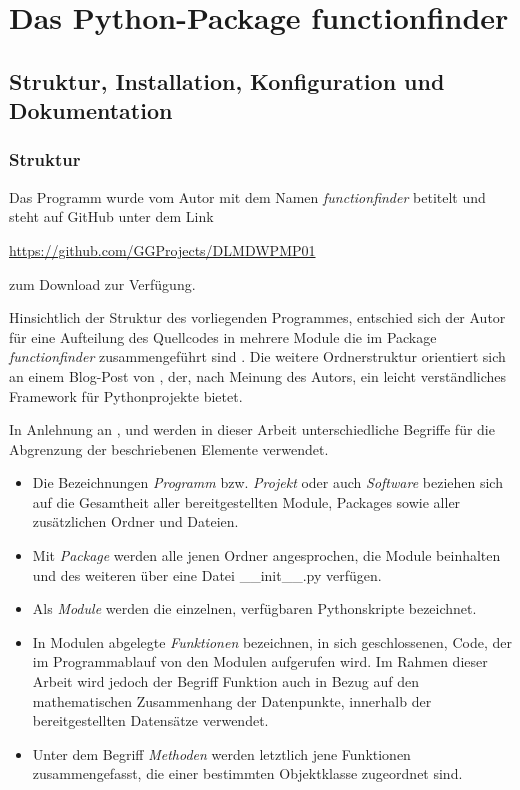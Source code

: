 \chapter{Das Python-Package functionfinder}

\section{Struktur, Installation, Konfiguration und Dokumentation}

\subsection{Struktur}

Das Programm wurde vom Autor mit dem Namen \emph{\glqq functionfinder\grqq} betitelt und steht auf GitHub unter dem Link \begin{center}\url{https://github.com/GGProjects/DLMDWPMP01}\end{center} zum Download zur Verfügung.

Hinsichtlich der Struktur des vorliegenden Programmes, entschied sich der Autor für eine Aufteilung des Quellcodes in mehrere Module die im Package \emph{functionfinder} zusammengeführt sind \citep[S. 242]{kofler_python_2022}. Die weitere Ordnerstruktur orientiert sich an einem Blog-Post von \cite{henk_griffioen_how_2017}, der, nach Meinung des Autors, ein leicht verständliches Framework für Pythonprojekte bietet.

In Anlehnung an \cite{croitoru_programmieren_2022}, \cite{kofler_python_2022} und \cite{henk_griffioen_how_2017} werden in dieser Arbeit unterschiedliche Begriffe für die Abgrenzung der beschriebenen Elemente verwendet.

\begin{itemize}
 \itemsep0pt
 \item Die Bezeichnungen \emph{Programm} bzw. \emph{Projekt} oder auch \emph{Software} beziehen sich auf die Gesamtheit aller bereitgestellten Module, Packages sowie aller zusätzlichen Ordner und Dateien.
 \item Mit \emph{Package} werden alle jenen Ordner angesprochen, die Module beinhalten und des weiteren über eine Datei \_\_init\_\_.py verfügen.
 \item Als \emph{Module} werden die einzelnen, verfügbaren Pythonskripte bezeichnet.
 \item In Modulen abgelegte \emph{Funktionen} bezeichnen, in sich geschlossenen, Code, der im Programmablauf von den Modulen aufgerufen wird. Im Rahmen dieser Arbeit wird jedoch der Begriff Funktion auch in Bezug auf den mathematischen Zusammenhang der Datenpunkte, innerhalb der bereitgestellten Datensätze verwendet.
 \item Unter dem Begriff \emph{Methoden} werden letztlich jene Funktionen zusammengefasst, die einer bestimmten Objektklasse zugeordnet sind.
\end{itemize}

